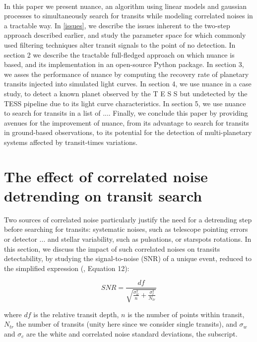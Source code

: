 \documentclass{aastex631}
\begin{document}
\bigskip\\
In this paper we present nuance, an algorithm using linear models and gaussian processes to simultaneously search for transits while modeling correlated noises in a tractable way. In \autoref{issues}, we describe the issues inherent to the two-step approach described earlier, and study the parameter space for which commonly used filtering techniques alter transit signals to the point of no detection. In section 2 we describe the tractable full-fledged approach on which nuance is based, and its implementation in an open-source Python package. In section 3, we asses the performance of nuance by computing the recovery rate of planetary transits injected into simulated light curves. In section 4, we use nuance in a case study, to detect a known planet observed by the T E S S but undetected by the TESS pipeline due to its light curve characteristics. In section 5, we use nuance to search for transits in a list of .... Finally, we conclude this paper by providing avenues for the improvement of nuance, from its advantage to search for transits in ground-based observations, to its potential for the detection of multi-planetary systems affected by transit-times variations.

\newpage
\section{The effect of correlated noise detrending on transit search}\label{issues}
Two sources of correlated noise particularly justify the need for a detrending step before searching for transits: systematic noises, such as telescope pointing errors or detector ... and stellar variability, such as pulsations, or starspots rotations. In this section, we discuss the impact of such correlated noises on transits detectability, by studying the signal-to-noise (SNR) of a unique event, reduced to the simplified expression (\citealt{pont2006}, Equation 12):

\begin{equation}\label{eq:snr}
  SNR= \frac{df}{\sqrt{\frac{\sigma_w^2}{n} + \frac{\sigma_r^2}{N_{tr}}}}
\end{equation}

where $df$ is the relative transit depth, $n$ is the number of points within transit, $N_{tr}$ the number of transits (unity here since we consider single transits), and $\sigma_w$ and $\sigma_c$ are the white and correlated noise standard deviations, the subscript.
\bigskip\\ 
\end{document}
